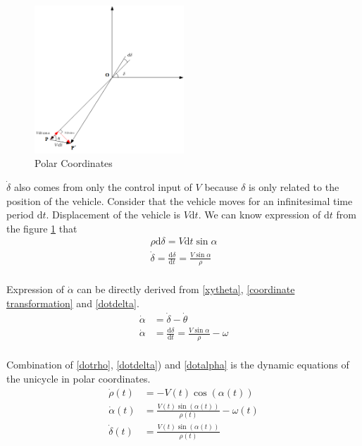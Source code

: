 \documentclass[twoside]{article}
\begin{document}
\begin{figure}[h]
\centering
\includegraphics[width=0.5\textwidth]{RhoAlphaDelta2.png}
\caption{Polar Coordinates}
\label{RhoAlphaDeltaFigure2}
\end{figure}

$\dot{\delta}$ also comes from only the control input of $V$ because $\delta$ is only related to the position of the vehicle. Consider that the vehicle moves for an infinitesimal time period $\mathrm{d}t$. Displacement of the vehicle is $V\mathrm{d}t$. We can know expression of $\mathrm{d}t$ from the figure \ref{RhoAlphaDeltaFigure2} that
\begin{equation} \label{dotdelta}
\begin{split}
\rho \mathrm{d}\delta = V \mathrm{d}t \sin\alpha \\
\dot{\delta} = \frac{\mathrm{d}\delta}{\mathrm{d}t}=\frac{V \sin\alpha}{\rho}  \\ 
\end{split}
\end{equation}

Expression of $\dot{\alpha}$ can be directly derived from \eqref{xytheta}, \eqref{coordinate transformation} and \eqref{dotdelta}.
\begin{equation} \label{dotalpha}
\begin{split}
\dot{\alpha} &= \dot{\delta} - \dot{\theta} \\
\dot{\alpha} &=  \frac{\mathrm{d}\delta}{\mathrm{d}t}=\frac{V \sin\alpha}{\rho} - \omega \\
\end{split}
\end{equation}

Combination of \eqref{dotrho}, \eqref{dotdelta}) and \eqref{dotalpha} is the dynamic equations of the unicycle in polar coordinates.
\begin{equation} \label{dotRhoDeltaAlpha}
\begin{split}
\dot{\rho}(t) &= -V(t) \cos(\alpha(t)) \\
\dot{\alpha}(t) &= \frac{V(t) \sin(\alpha(t))}{\rho(t)} - \omega(t) \\
\dot{\delta}(t) &= \frac{V(t) \sin(\alpha(t))}{\rho(t)}  \\ 
\end{split}
\end{equation}
\end{document}

